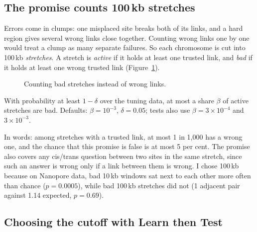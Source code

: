 \documentclass[11pt]{article}
\begin{document}
\subsection{The promise counts 100\,kb stretches}

Errors come in clumps: one misplaced site breaks both of its links, and a
hard region gives several wrong links close together. Counting wrong links
one by one would treat a clump as many separate failures. So each chromosome
is cut into 100\,kb \emph{stretches}. A stretch is \emph{active} if it holds
at least one trusted link, and \emph{bad} if it holds at least one wrong
trusted link (Figure~\ref{fig:stretch}).

\begin{figure}[h]
\centering
{}
\caption{Counting bad stretches instead of wrong links.}
\label{fig:stretch}
\end{figure}

\begin{definition}
With probability at least $1-\delta$ over the tuning data, at most a share
$\beta$ of active stretches are bad. Defaults: $\beta=10^{-3}$, $\delta=0.05$;
tests also use $\beta=3\times10^{-4}$ and $3\times10^{-3}$.
\end{definition}

In words: among stretches with a trusted link, at most 1 in 1{,}000 has a
wrong one, and the chance that this promise is false is at most 5 per cent.
The promise also covers any cis/trans question between two sites in the same
stretch, since such an answer is wrong only if a link between them is wrong.
I chose 100\,kb because on Nanopore data, bad 10\,kb windows sat next to
each other more often than chance ($p=0.0005$), while bad 100\,kb stretches
did not (1 adjacent pair against 1.14 expected, $p=0.69$).

\subsection{Choosing the cutoff with Learn then Test}
\end{document}
